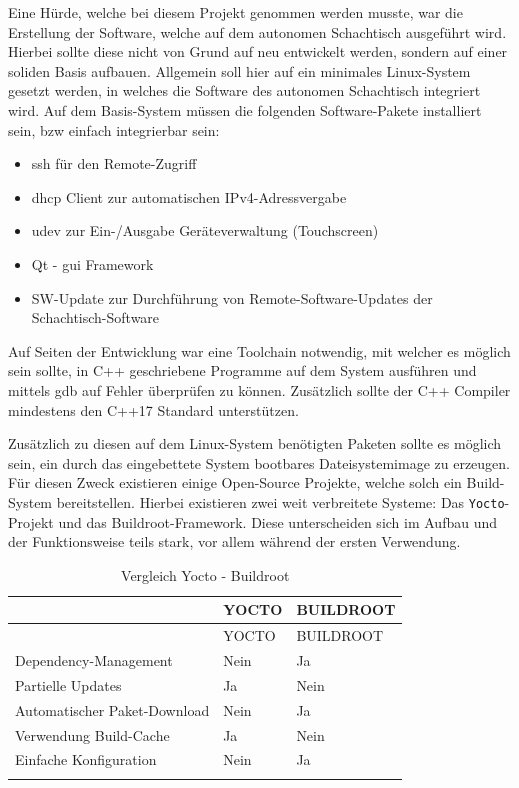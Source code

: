 Eine Hürde, welche bei diesem Projekt genommen werden musste, war die
Erstellung der Software, welche auf dem autonomen Schachtisch ausgeführt
wird. Hierbei sollte diese nicht von Grund auf neu entwickelt werden,
sondern auf einer soliden Basis aufbauen. Allgemein soll hier auf ein
minimales Linux-System gesetzt werden, in welches die Software des
autonomen Schachtisch integriert wird. Auf dem Basis-System müssen die
folgenden Software-Pakete installiert sein, bzw einfach integrierbar
sein:

\begin{itemize}
\tightlist
\item
  \gls{ssh} für den Remote-Zugriff
\item
  \gls{dhcp} Client zur automatischen IPv4-Adressvergabe
\item
  \gls{udev} zur Ein-/Ausgabe Geräteverwaltung (Touchscreen)
\item
  Qt\cite{qtframework} - \gls{gui} Framework
\item
  SW-Update zur Durchführung von Remote-Software-Updates der
  Schachtisch-Software
\end{itemize}

Auf Seiten der Entwicklung war eine Toolchain notwendig, mit welcher es
möglich sein sollte, in C++ geschriebene Programme auf dem System
ausführen und mittels \gls{gdb} auf Fehler überprüfen zu können.
Zusätzlich sollte der C++ Compiler mindestens den C++17 Standard
unterstützen.

Zusätzlich zu diesen auf dem Linux-System benötigten Paketen sollte es
möglich sein, ein durch das eingebettete System bootbares
Dateisystemimage zu erzeugen. Für diesen Zweck existieren einige
Open-Source Projekte, welche solch ein Build-System bereitstellen.
Hierbei existieren zwei weit verbreitete Systeme: Das
\passthrough{\lstinline!Yocto!}-Projekt\cite{yoctoproject} und das
Buildroot\cite{buildrootproject}-Framework. Diese unterscheiden sich
im Aufbau und der Funktionsweise teils stark, vor allem während der
ersten Verwendung.

\begin{longtable}[]{@{}lll@{}}
\caption{Vergleich Yocto - Buildroot
\label{commchesstables}}\tabularnewline
\toprule
& YOCTO & BUILDROOT\tabularnewline
\midrule
\endfirsthead
\toprule
& YOCTO & BUILDROOT\tabularnewline
\midrule
\endhead
Dependency-Management & Nein & Ja\tabularnewline
Partielle Updates & Ja & Nein\tabularnewline
Automatischer Paket-Download & Nein & Ja\tabularnewline
Verwendung Build-Cache & Ja & Nein\tabularnewline
Einfache Konfiguration & Nein & Ja\tabularnewline
& &\tabularnewline
\bottomrule
\end{longtable}

